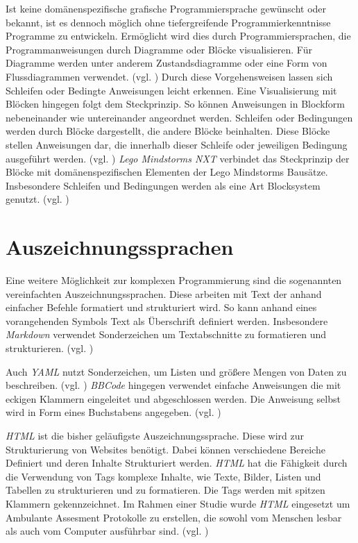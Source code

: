 Ist keine domänenspezifische grafische Programmiersprache gewünscht oder bekannt, ist es dennoch möglich ohne tiefergreifende Programmierkenntnisse Programme zu entwickeln. Ermöglicht wird dies durch Programmiersprachen, die Programmanweisungen durch Diagramme oder Blöcke visualisieren. Für Diagramme werden unter anderem Zustandsdiagramme oder eine Form von Flussdiagrammen verwendet. (vgl. \cite{SwissEdu45:online} \cite{DRAKONEd12:online} \cite{PureData15:online}) Durch diese Vorgehensweisen lassen sich Schleifen oder Bedingte Anweisungen leicht erkennen. Eine Visualisierung mit Blöcken hingegen folgt dem Steckprinzip. So können Anweisungen in Blockform nebeneinander wie untereinander angeordnet werden. Schleifen oder Bedingungen werden durch Blöcke dargestellt, die andere Blöcke beinhalten. Diese Blöcke stellen Anweisungen dar, die innerhalb dieser Schleife oder jeweiligen Bedingung ausgeführt werden. (vgl. \cite{BlocklyG18:online} \cite{NXTSoftw71:online} \cite{SnapBuil34:online} \cite{squeakla50:online}) \emph{Lego Mindstorms NXT} verbindet das Steckprinzip der Blöcke mit domänenspezifischen Elementen der Lego Mindstorms Bausätze. Insbesondere Schleifen und Bedingungen werden als eine Art Blocksystem genutzt. (vgl. \cite{NXTSoftw71:online})


\section{Auszeichnungssprachen}

Eine weitere Möglichkeit zur komplexen Programmierung sind die sogenannten vereinfachten Auszeichnungssprachen. Diese arbeiten mit Text der anhand einfacher Befehle formatiert und strukturiert wird. So kann anhand eines vorangehenden Symbols Text als Überschrift definiert werden. Insbesondere \emph{Markdown} verwendet Sonderzeichen um Textabschnitte zu formatieren und strukturieren. (vgl. \cite{GettingS56:online}) 

Auch \emph{YAML} nutzt Sonderzeichen, um Listen und größere Mengen von Daten zu beschreiben. (vgl. \cite{TheOffic64:online}) \emph{BBCode} hingegen verwendet einfache Anweisungen die mit eckigen Klammern eingeleitet und abgeschlossen werden. Die Anweisung selbst wird in Form eines Buchstabens angegeben. (vgl. \cite{BBCodeor24:online})

\emph{HTML} ist die bisher geläufigste Auszeichnungssprache. Diese wird zur Strukturierung von Websites benötigt. Dabei können verschiedene Bereiche Definiert und deren Inhalte Strukturiert werden. \emph{HTML} hat die Fähigkeit durch die Verwendung von Tags komplexe Inhalte, wie Texte, Bilder, Listen und Tabellen zu strukturieren und zu formatieren. Die Tags werden mit spitzen Klammern gekennzeichnet. Im Rahmen einer Studie wurde \emph{HTML} eingesetzt um Ambulante Assesment Protokolle zu erstellen, die sowohl vom Menschen lesbar als auch vom Computer ausführbar sind. (vgl. \cite{Batalas2018})

